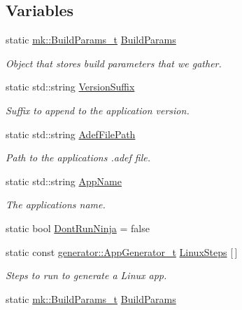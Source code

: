 \subsection*{Variables}
\begin{DoxyCompactItemize}
\item 
static \hyperlink{structmk_1_1_build_params__t}{mk\+::\+Build\+Params\+\_\+t} \hyperlink{namespacecli_a4b3f8be996a29096d321c822dd8a7521}{Build\+Params}
\begin{DoxyCompactList}\small\item\em Object that stores build parameters that we gather. \end{DoxyCompactList}\item 
static std\+::string \hyperlink{namespacecli_a8f1472913c8063fd02c6e81c4cd1ce12}{Version\+Suffix}
\begin{DoxyCompactList}\small\item\em Suffix to append to the application version. \end{DoxyCompactList}\item 
static std\+::string \hyperlink{namespacecli_a43080cfa6871e332b48e838134a09abb}{Adef\+File\+Path}
\begin{DoxyCompactList}\small\item\em Path to the application\textquotesingle{}s .adef file. \end{DoxyCompactList}\item 
static std\+::string \hyperlink{namespacecli_a72f0db648f5dcb09bab38f233e78d511}{App\+Name}
\begin{DoxyCompactList}\small\item\em The application\textquotesingle{}s name. \end{DoxyCompactList}\item 
static bool \hyperlink{namespacecli_a9aa7b41991b7a654aeaad913f5a2c257}{Dont\+Run\+Ninja} = false
\item 
static const \hyperlink{namespacegenerator_a0dab6a94633151cc90073170ce71a25c}{generator\+::\+App\+Generator\+\_\+t} \hyperlink{namespacecli_ac748ac806e1653b10b7d69d03de49c0a}{Linux\+Steps} \mbox{[}$\,$\mbox{]}
\begin{DoxyCompactList}\small\item\em Steps to run to generate a Linux app. \end{DoxyCompactList}\item 
static \hyperlink{structmk_1_1_build_params__t}{mk\+::\+Build\+Params\+\_\+t} \hyperlink{namespacecli_a4b3f8be996a29096d321c822dd8a7521}{Build\+Params}

\end{DoxyCompactItemize}
